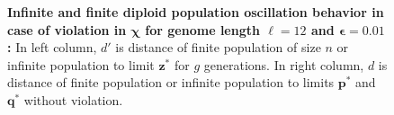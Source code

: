 \begin{figure}[h]
\begin{center}
\hspace{-3em}%
\vspace{-0.5em}  \hspace{-3em}%


\caption{\textbf{Infinite and finite diploid population oscillation behavior in case of violation in $\bm{\chi}$ for genome length $\ell = 12$ and $\bm{\epsilon} = 0.01$:} 
  In left column, $d'$ is distance of finite population of size $n$ or infinite population to limit $\bm{z}^\ast$ for $g$ generations. In right column, $d$ is distance of finite population or infinite population to limits $\bm{p}^\ast$ and $\bm{q}^\ast$ without violation.}
\label{oscillation_12d_vio_chi_0.01}
\end{center}
\end{figure}

